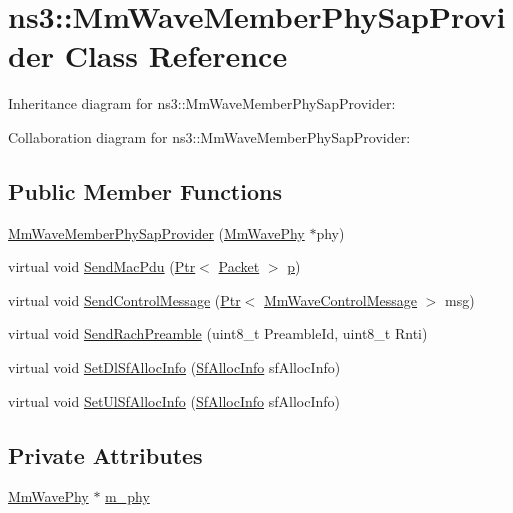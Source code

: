 \hypertarget{classns3_1_1MmWaveMemberPhySapProvider}{}\section{ns3\+:\+:Mm\+Wave\+Member\+Phy\+Sap\+Provider Class Reference}
\label{classns3_1_1MmWaveMemberPhySapProvider}


Inheritance diagram for ns3\+:\+:Mm\+Wave\+Member\+Phy\+Sap\+Provider\+:


Collaboration diagram for ns3\+:\+:Mm\+Wave\+Member\+Phy\+Sap\+Provider\+:
\subsection*{Public Member Functions}
\begin{DoxyCompactItemize}
\item 
\hyperlink{classns3_1_1MmWaveMemberPhySapProvider_a532e838738c023b4a2541df0aed8fec7}{Mm\+Wave\+Member\+Phy\+Sap\+Provider} (\hyperlink{classns3_1_1MmWavePhy}{Mm\+Wave\+Phy} $\ast$phy)
\item 
virtual void \hyperlink{classns3_1_1MmWaveMemberPhySapProvider_a595978e8bbce2e9e957f5e8d9c182902}{Send\+Mac\+Pdu} (\hyperlink{classns3_1_1Ptr}{Ptr}$<$ \hyperlink{classns3_1_1Packet}{Packet} $>$ \hyperlink{lte__link__budget__x2__handover__measures_8m_ac9de518908a968428863f829398a4e62}{p})
\item 
virtual void \hyperlink{classns3_1_1MmWaveMemberPhySapProvider_acbe52bdccdecd55ab7cdc4524e3b9efc}{Send\+Control\+Message} (\hyperlink{classns3_1_1Ptr}{Ptr}$<$ \hyperlink{classns3_1_1MmWaveControlMessage}{Mm\+Wave\+Control\+Message} $>$ msg)
\item 
virtual void \hyperlink{classns3_1_1MmWaveMemberPhySapProvider_a32c6ea9336358e113c19ed135727f926}{Send\+Rach\+Preamble} (uint8\+\_\+t Preamble\+Id, uint8\+\_\+t Rnti)
\item 
virtual void \hyperlink{classns3_1_1MmWaveMemberPhySapProvider_aea93a037f8d99fd8546f28e2c01bffc2}{Set\+Dl\+Sf\+Alloc\+Info} (\hyperlink{structns3_1_1SfAllocInfo}{Sf\+Alloc\+Info} sf\+Alloc\+Info)
\item 
virtual void \hyperlink{classns3_1_1MmWaveMemberPhySapProvider_a797920e46ee946f861c25d4595622e91}{Set\+Ul\+Sf\+Alloc\+Info} (\hyperlink{structns3_1_1SfAllocInfo}{Sf\+Alloc\+Info} sf\+Alloc\+Info)
\end{DoxyCompactItemize}
\subsection*{Private Attributes}
\begin{DoxyCompactItemize}
\item 
\hyperlink{classns3_1_1MmWavePhy}{Mm\+Wave\+Phy} $\ast$ \hyperlink{classns3_1_1MmWaveMemberPhySapProvider_abb62af2710d783ae91e4fd71c41dfc0b}{m\+\_\+phy}
\end{DoxyCompactItemize}


